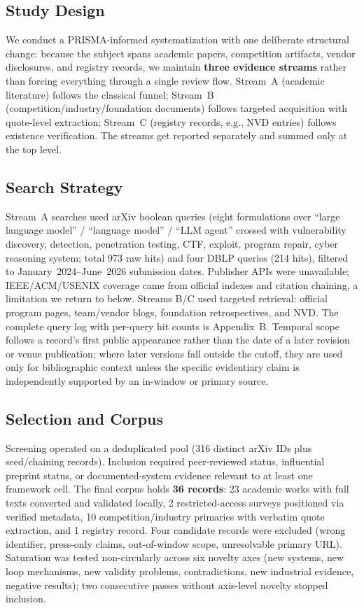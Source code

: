 \documentclass[conference,compsoc]{IEEEtran}
\begin{document}
\subsection{Study Design}
We conduct a PRISMA-informed systematization with one deliberate structural change: because the
subject spans academic papers, competition artifacts, vendor disclosures, and registry records,
we maintain \textbf{three evidence streams} rather than forcing everything through a single
review flow. Stream~A (academic literature) follows the classical funnel; Stream~B
(competition/industry/foundation documents) follows targeted acquisition with quote-level
extraction; Stream~C (registry records, e.g., NVD entries) follows existence verification. The
streams get reported separately and summed only at the top level.

\subsection{Search Strategy}
Stream~A searches used arXiv boolean queries (eight formulations over ``large language model''
/ ``language model'' / ``LLM agent'' crossed with vulnerability discovery, detection,
penetration testing, CTF, exploit, program repair, cyber reasoning system; total 973 raw hits)
and four DBLP queries (214 hits), filtered to January~2024--June~2026 submission dates.
Publisher APIs were unavailable; IEEE/ACM/USENIX coverage came from official indexes and
citation chaining, a limitation we return to below. Streams B/C used targeted retrieval:
official program pages, team/vendor blogs, foundation retrospectives, and NVD. The complete
query log with per-query hit counts is Appendix~B. Temporal scope follows a record's first
public appearance rather than the date of a later revision or venue publication; where later
versions fall outside the cutoff, they are used only for bibliographic context unless the
specific evidentiary claim is independently supported by an in-window or primary source.



\subsection{Selection and Corpus}
Screening operated on a deduplicated pool (316 distinct arXiv IDs plus seed/chaining records).
Inclusion required peer-reviewed status, influential preprint status, or documented-system
evidence relevant to at least one framework cell. The final corpus holds \textbf{36 records}:
23 academic works with full texts converted and validated locally, 2 restricted-access
surveys positioned via verified metadata, 10 competition/industry primaries with verbatim
quote extraction, and 1 registry record. Four candidate records were excluded (wrong
identifier, press-only claims, out-of-window scope, unresolvable primary URL). Saturation was
tested non-circularly across six novelty axes (new systems, new loop mechanisms, new validity
problems, contradictions, new industrial evidence, negative results); two consecutive passes
without axis-level novelty stopped inclusion.
\end{document}
